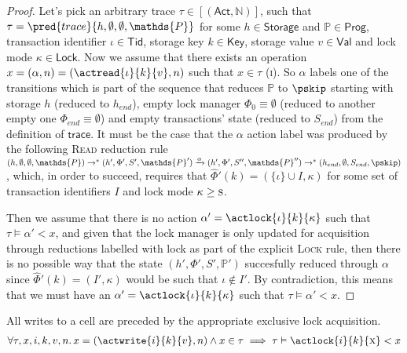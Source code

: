 \begin{proof}
Let's pick an arbitrary trace $\tau \in [(\mathsf{Act}, \mathds{N})]$, such that $\tau = \pred{trace}{h, \emptyset, \emptyset, \mathds{P}}$ for some $h \in \mathsf{Storage}$ and $\mathds{P} \in \mathsf{Prog}$, transaction identifier $\iota \in \mathsf{Tid}$, storage key $k \in \mathsf{Key}$, storage value $v \in \mathsf{Val}$ and lock mode $\kappa \in \mathsf{Lock}$. Now we assume that there exists an operation $x = (\alpha, n) = (\actread{\iota}{k}{v}, n)$ such that $x \in \tau$ (\textsc{i}). So $\alpha$ labels one of the transitions which is part of the sequence that reduces $\mathds{P}$ to $\pskip$ starting with storage $h$ (reduced to $h_{end}$), empty lock manager $\Phi_0 \equiv \emptyset$ (reduced to another empty one $\Phi_{end} \equiv \emptyset$) and empty transactions' state (reduced to $S_{end}$) from the definition of $\mathsf{trace}$. It must be the case that the $\alpha$ action label was produced by the following \textsc{Read} reduction rule $(h, \emptyset, \emptyset, \mathds{P}) \rightarrow^* (h', \Phi', S', \mathds{P}') \xrightarrow{\alpha} (h', \Phi', S'', \mathds{P}'') \rightarrow^* (h_{end}, \emptyset, S_{end}, \pskip)$, which, in order to succeed, requires that $\hat{\Phi}'(k) = (\{ \iota \} \cup I, \kappa)$ for some set of transaction identifiers $I$ and lock mode $\kappa \geq \textsc{s}$.

Then we assume that there is no action $\alpha' = \actlock{\iota}{k}{\kappa}$ such that $\tau \vDash \alpha' < x$, and given that the lock manager is only updated for acquisition through reductions labelled with \textsf{lock} as part of the explicit \textsc{Lock} rule, then there is no possible way that the state $(h', \Phi', S', \mathds{P}')$ succesfully reduced through $\alpha$ since $\hat{\Phi}'(k) = (I'
, \kappa)$ would be such that $\iota \not\in I'$. By contradiction, this means that we must have an $\alpha' = \actlock{\iota}{k}{\kappa}$ such that $\tau \vDash \alpha' < x$.
\end{proof}

\lem \label{lem:write} All writes to a cell are preceded by the appropriate exclusive lock acquisition.
\begin{gather*}
\forall \tau, x, i, k, v, n \ldotp
x = (\actwrite{i}{k}{v}, n) \land x \in \tau \implies
\tau \vDash \actlock{i}{k}{\textsc{x}} < x
\end{gather*}

